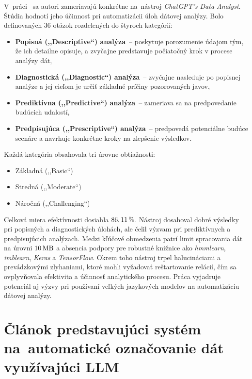 V~práci~\cite{de2024effective} sa autori zameriavajú konkrétne na~nástroj \textit{ChatGPT's Data Analyst}. Štúdia hodnotí jeho účinnosť pri automatizácii úloh dátovej analýzy. Bolo definovaných 36 otázok rozdelených do štyroch kategórií:
\begin{itemize}
\item \textbf{Popisná (,,Descriptive``) analýza}~-- poskytuje porozumenie údajom tým, že ich detailne opisuje, a zvyčajne predstavuje počiatočný krok v procese analýzy dát,

\item \textbf{Diagnostická (,,Diagnostic``) analýza}~-- zvyčajne nasleduje po popisnej analýze a jej cieľom je určiť základné príčiny pozorovaných javov,

\item \textbf{Prediktívna (,,Predictive``) analýza}~-- zameriava sa na predpovedanie budúcich udalostí,

\item \textbf{Predpisujúca (,,Prescriptive``) analýza}~-- predpovedá potenciálne budúce scenáre a navrhuje konkrétne kroky na zlepšenie výsledkov.
\end{itemize}

Každá kategória obsahovala tri úrovne obtiažnosti:
\begin{itemize}
\item Základná (,,Basic``)
\item Stredná (,,Moderate``)
\item Náročná (,,Challenging``)
\end{itemize}

Celková miera efektívnosti dosiahla $86,11\,\rm \%$. Nástroj dosahoval dobré výsledky pri popisných a diagnostických úlohách, ale čelil výzvam pri prediktívnych a predpisujúcich analýzach. Medzi kľúčové obmedzenia patrí limit spracovania dát na úrovni $10\,\rm MB$ a absencia podpory pre robustné knižnice ako \textit{hmmlearn}, \textit{imblearn}, \textit{Keras} a \textit{TensorFlow}. Okrem toho nástroj trpel halucináciami a prevádzkovými zlyhaniami, ktoré mohli vyžadovať reštartovanie relácií, čím sa ovplyvňovala efektivita a účinnosť analytického procesu. Práca vyjadruje potenciál aj výzvy pri používaní veľkých jazykových modelov na automatizáciu dátovej analýzy.

\section{Článok predstavujúci systém na~automatické označovanie dát využívajúci LLM}

